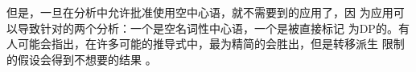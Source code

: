 但是，一旦在分析中允许批准使用空中心语，就不需要到的应用了，因
为应用可以导致针对的两个分析：一个是空名词性中心语，一个是被直接标记
为DP的。有人可能会指出，在许多可能的推导式中，最为精简的会胜出，但是转移派生
限制的假设会得到不想要的结果
\citep[\S~5]{Pullum2013a}。

